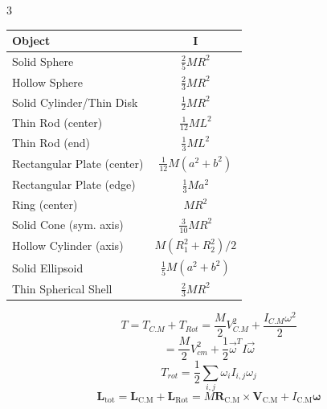 \documentclass[1pt]{article}
\begin{document}
\begin{multicols}{3}
\begin{center}
\renewcommand{\arraystretch}{1.1}
\setlength{\tabcolsep}{4pt}
\begin{tabular}{|l|c|}
\hline
\textbf{Object} & \(\mathbf{I}\) \\ \hline
Solid Sphere & \(\frac{2}{5}MR^2\) \\ \hline   
Hollow Sphere & \(\frac{2}{3}MR^2\) \\ \hline   
Solid Cylinder/Thin Disk & \(\frac{1}{2}MR^2\) \\ \hline   
Thin Rod (center) & \(\frac{1}{12}ML^2\) \\ \hline   
Thin Rod (end) & \(\frac{1}{3}ML^2\) \\ \hline   
Rectangular Plate (center) & \(\frac{1}{12}M(a^2+b^2)\) \\ \hline   
Rectangular Plate (edge) & \(\frac{1}{3}Ma^2\) \\ \hline   
Ring (center) & \(MR^2\) \\ \hline   
Solid Cone (sym. axis) & \(\frac{3}{10}MR^2\) \\ \hline   
Hollow Cylinder (axis) & \(M(R_1^2 + R_2^2)/2\) \\ \hline   
Solid Ellipsoid & \(\frac{1}{5}M(a^2 + b^2)\) \\ \hline   
Thin Spherical Shell & \(\frac{2}{3}MR^2\) \\ \hline  
\end{tabular}
\end{center}


\[
T=T_{C.M}+T_{Rot}=\frac{M}{2}V_{C.M}^2+\frac{I_{C.M}\omega^2}{2} \]
\[= \frac{M}{2}V_{cm}^{2}+\frac{1}{2}\vec{\omega}^{T}I\vec{\omega}
\]
\[
T_{rot}=\frac{1}{2}\sum_{i,j}\omega_{i}I_{i,j}\omega_{j}
\]
\[
\mathbf{L}_{\text{tot}} = \mathbf{L}_{\text{C.M}} + \mathbf{L}_{\text{Rot}} 
= M \mathbf{R}_{\text{C.M}} \times \mathbf{V}_{\text{C.M}} + I_{\text{C.M}} \boldsymbol{\omega}
\]



\end{multicols}
\end{document}
